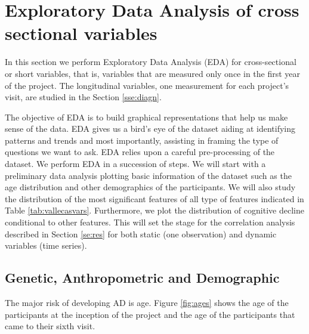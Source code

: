 \documentclass[11pt]{article}
\theoremstyle{definition}
\theoremstyle{remark}
\begin{document}
\section{Exploratory Data Analysis of cross sectional variables}
\label{sse:eda}
In this section we perform Exploratory Data Analysis (EDA) for cross-sectional or short variables, that is, variables that are measured only once in the first year of the project. The longitudinal variables, one measurement for each project's visit, are studied in the Section \ref{sse:diagn}.

The objective of EDA is to build graphical representations that help us make sense of the data. EDA gives us a bird's eye of the dataset aiding at identifying patterns and trends and most importantly, assisting in framing the type of questions we want to ask.
EDA relies upon a careful pre-processing of the dataset. We perform EDA in a succession of steps. We will start with a preliminary data analysis plotting basic information of the dataset such as the age distribution and other demographics of the participants. 
We will also study the distribution of the most significant features of all type of features indicated in Table \ref{tab:vallecasvars}. Furthermore, we plot the distribution of cognitive decline conditional to other features. This will set the stage for the correlation analysis described in Section \ref{se:res} for both static (one observation) and dynamic variables (time series).


\subsection{Genetic, Anthropometric and Demographic}
\label{ssse:ant}

The major risk of developing AD is age. Figure \ref{fig:ages} shows the age of the participants at the inception of the project and the age of the participants that came to their sixth visit.
\end{document}
